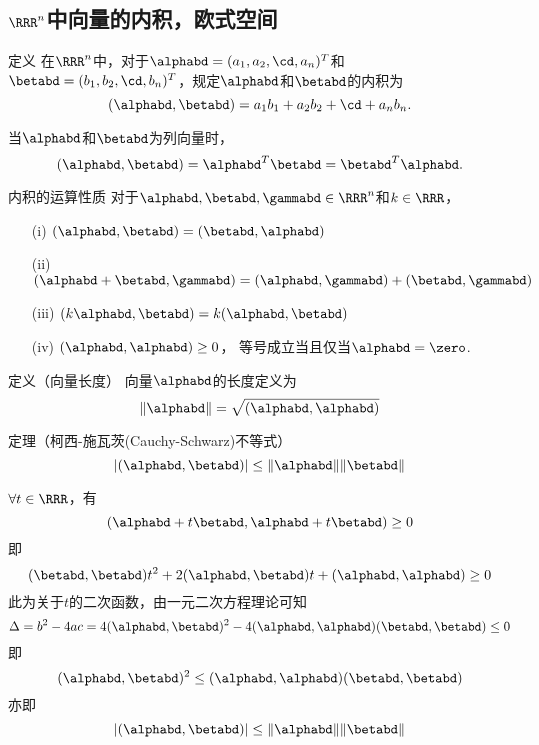 \subsection{$\RRR^n$中向量的内积，欧式空间}
\begin{frame}
  \begin{footnotesize}
    \begin{block}{定义}
      在$\RRR^n$中，对于$\alphabd=(a_1,a_2,\cd,a_n)^T$和$\betabd=(b_1,b_2,\cd,b_n)^T$，规定$\alphabd$和$\betabd$的内积为
      $$
      (\alphabd,\betabd)=a_1b_1+a_2b_2+\cd+a_nb_n.
      $$
    \end{block}
    当$\alphabd$和$\betabd$为列向量时，
    $$
    (\alphabd,\betabd)=\alphabd^T\betabd=\betabd^T\alphabd.
    $$
  \end{footnotesize}
\end{frame}

\begin{frame}
  \begin{footnotesize}
    \begin{block}{内积的运算性质}
      对于$\alphabd,\betabd,\gammabd\in\RRR^n$和$k\in\RRR$，
      \begin{itemize}
      \item[(i)]   $(\alphabd,\betabd)=(\betabd,\alphabd)$
      \item[(ii)]  $(\alphabd+\betabd,\gammabd)=(\alphabd,\gammabd)+(\betabd,\gammabd)$
      \item[(iii)] $(k\alphabd,\betabd)=k(\alphabd,\betabd)$
      \item[(iv)]  $(\alphabd,\alphabd)\ge0$， 等号成立当且仅当$\alphabd=\zero$.
      \end{itemize}
    \end{block}
    \pause
    \begin{block}{定义（向量长度）}
      向量$\alphabd$的长度定义为
      $$
      \|\alphabd\|=\sqrt{(\alphabd,\alphabd)}
      $$
    \end{block}
  \end{footnotesize}
\end{frame}


\begin{frame}
  \begin{footnotesize}
    \begin{block}{定理（柯西-施瓦茨(Cauchy-Schwarz)不等式）}
      $$
      |(\alphabd,\betabd)|\le\|\alphabd\|\|\betabd\|
      $$
    \end{block}
    \pause 
    \proofname
    $\forall t \in \RRR$，有
    $$
    (\alphabd+t\betabd,\alphabd+t\betabd) \ge 0
    $$
    即
    $$
    (\betabd,\betabd)t^2+2(\alphabd,\betabd)t+(\alphabd,\alphabd)\ge0
    $$
    此为关于$t$的二次函数，由一元二次方程理论可知
    $$
    \Delta = b^2-4ac = 4 (\alphabd,\betabd)^2-4(\alphabd,\alphabd)(\betabd,\betabd)\le 0
    $$
    即
    $$
    (\alphabd,\betabd)^2\le (\alphabd,\alphabd)(\betabd,\betabd)
    $$
    亦即
    $$
    |(\alphabd,\betabd)|\le\|\alphabd\|\|\betabd\|
    $$
  \end{footnotesize}
\end{frame}


